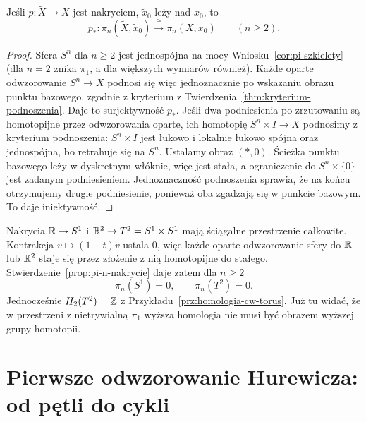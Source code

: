 \begin{stwierdzenie}
\label{prop:pi-n-nakrycie}
Jeśli $p:\widetilde X\to X$
jest nakryciem, $\widetilde x_0$
leży nad $x_0$, to
\[
 p_*:\pi_n(\widetilde X,\widetilde x_0)
 \xrightarrow{\ \cong\ }
 \pi_n(X,x_0)\qquad(n\geq2).
\]
\end{stwierdzenie}
\begin{proof}
Sfera $S^n$ dla $n\geq2$
jest jednospójna na mocy
Wniosku~\ref{cor:pi-szkielety}
(dla $n=2$ znika $\pi_1$,
a dla większych wymiarów
również). Każde oparte
odwzorowanie $S^n\to X$ podnosi
się więc jednoznacznie
po wskazaniu obrazu
punktu bazowego,
zgodnie z kryterium
z Twierdzenia~\ref{thm:kryterium-podnoszenia}.
Daje to surjektywność $p_*$.
Jeśli dwa podniesienia
po zrzutowaniu są
homotopijne przez odwzorowania oparte,
ich homotopię
$S^n\times I\to X$ podnosimy z kryterium podnoszenia:
$S^n\times I$ jest łukowo i lokalnie łukowo spójna oraz jednospójna,
bo retrahuje się na $S^n$. Ustalamy obraz $(\ast,0)$.
Ścieżka punktu bazowego leży w dyskretnym włóknie, więc jest stała,
a ograniczenie do $S^n\times\{0\}$ jest zadanym podniesieniem.
Jednoznaczność podnoszenia
sprawia, że na końcu
otrzymujemy drugie
podniesienie, ponieważ
oba zgadzają się w
punkcie bazowym.
To daje iniektywność.
\end{proof}

\begin{przyklad}
\label{prz:pi-torus}
Nakrycia $\mathbb{R}\to S^1$ i
$\mathbb{R}^2\to T^2=S^1\times S^1$
mają ściągalne przestrzenie
całkowite. Kontrakcja $v\mapsto(1-t)v$ ustala $0$,
więc każde oparte odwzorowanie sfery do $\mathbb{R}$ lub $\mathbb{R}^2$
staje się przez złożenie z nią homotopijne do stałego.
Stwierdzenie~\ref{prop:pi-n-nakrycie} daje zatem dla $n\geq2$
\[
 \pi_n(S^1)=0,\qquad
 \pi_n(T^2)=0.
\]
Jednocześnie
$H_2(T^2)=\mathbb{Z}$ z
Przykładu~\ref{prz:homologia-cw-torus}.
Już tu widać, że w
przestrzeni z nietrywialną
$\pi_1$ wyższa homologia
nie musi być obrazem
wyższej grupy homotopii.
\end{przyklad}


\section{Pierwsze odwzorowanie Hurewicza: od pętli do cykli}
\label{sec:hurewicz-jeden}

